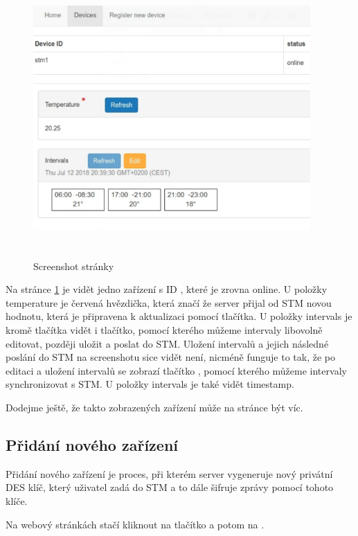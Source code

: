 \begin{figure}[tbh!]
\includegraphics[width=400px, height=400px]{../img/devices_screenshot.pdf}
\caption{Screenshot  stránky}
\label{devices-screenshot}
\end{figure}

Na stránce \ref{devices-screenshot} je vidět jedno zařízení s ID , které je zrovna online.
U položky temperature je červená hvězdička, která značí že server přijal od STM novou hodnotu, která
je připravena k aktualizaci pomocí  tlačítka.
U položky intervals je kromě  tlačítka vidět i  tlačítko, pomocí kterého můžeme intervaly
libovolně editovat, později uložit a poslat do STM.
Uložení intervalů a jejich následné poslání do STM na screenshotu sice vidět není, nicméně funguje to
tak, že po editaci a uložení intervalů se zobrazí tlačítko , pomocí kterého můžeme
intervaly synchronizovat s STM.
U položky intervals je také vidět timestamp.

Dodejme ještě, že takto zobrazených zařízení může na stránce být víc.

\subsection{Přidání nového zařízení}
Přidání nového zařízení je proces, při kterém server vygeneruje nový privátní DES klíč, který uživatel
zadá do STM a to dále šifruje zprávy pomocí tohoto klíče.

Na webový stránkách stačí kliknout na tlačítko  a potom na .


